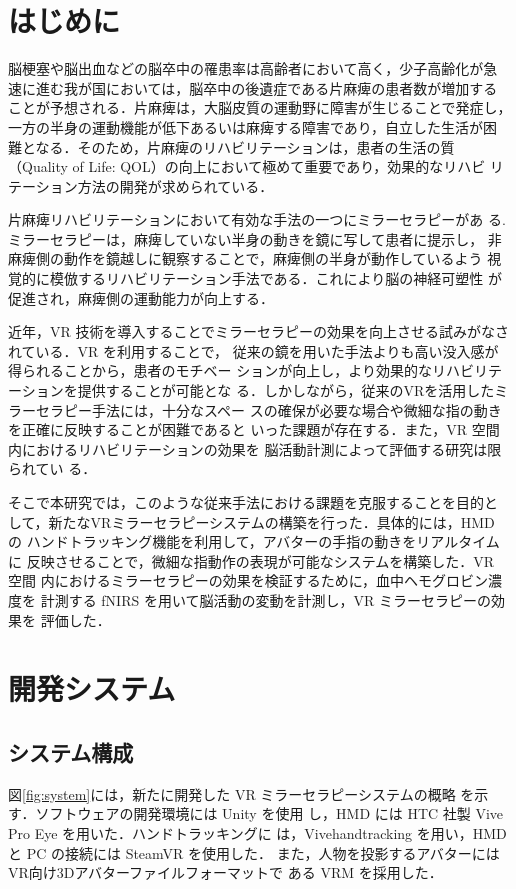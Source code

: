 
\section{はじめに}
脳梗塞や脳出血などの脳卒中の罹患率は高齢者において高く，少子高齢化が急
速に進む我が国においては，脳卒中の後遺症である片麻痺の患者数が増加する
ことが予想される．片麻痺は，大脳皮質の運動野に障害が生じることで発症し，
一方の半身の運動機能が低下あるいは麻痺する障害であり，自立した生活が困
難となる．そのため，片麻痺のリハビリテーションは，患者の生活の質
（Quality of Life: QOL）の向上において極めて重要であり，効果的なリハビ
リテーション方法の開発が求められている．

片麻痺リハビリテーションにおいて有効な手法の一つにミラーセラピーがあ
る. ミラーセラピーは，麻痺していない半身の動きを鏡に写して患者に提示し，
非麻痺側の動作を鏡越しに観察することで，麻痺側の半身が動作しているよう
視覚的に模倣するリハビリテーション手法である．これにより脳の神経可塑性
が促進され，麻痺側の運動能力が向上する．

近年，VR 技術を導入することでミラーセラピーの効果を向上させる試みがなさ
れている\cite{Weber}\cite{Heinrich}\cite{Miclaus}．VR を利用することで，
従来の鏡を用いた手法よりも高い没入感が得られることから，患者のモチベー
ションが向上し，より効果的なリハビリテーションを提供することが可能とな
る．しかしながら，従来のVRを活用したミラーセラピー手法には，十分なスペー
スの確保が必要な場合や微細な指の動きを正確に反映することが困難であると
いった課題が存在する．また，VR 空間内におけるリハビリテーションの効果を
脳活動計測によって評価する研究は限られてい
る\cite{Peng}\cite{Dordevic}\cite{Deng}．

そこで本研究では，このような従来手法における課題を克服することを目的と
して，新たなVRミラーセラピーシステムの構築を行った．具体的には，HMD の
ハンドトラッキング機能を利用して，アバターの手指の動きをリアルタイムに
反映させることで，微細な指動作の表現が可能なシステムを構築した．VR 空間
内におけるミラーセラピーの効果を検証するために，血中ヘモグロビン濃度を
計測する fNIRS を用いて脳活動の変動を計測し，VR ミラーセラピーの効果を
評価した．

\section{開発システム}
\subsection{システム構成}
図\ref{fig:system}には，新たに開発した VR ミラーセラピーシステムの概略
を示す．ソフトウェアの開発環境には Unity を使用
し，HMD には HTC 社製 Vive Pro Eye を用いた．ハンドトラッキングに
は，Vivehandtracking を用い，HMD と PC の接続には SteamVR を使用した．
また，人物を投影するアバターにはVR向け3Dアバターファイルフォーマットで
ある VRM を採用した．

